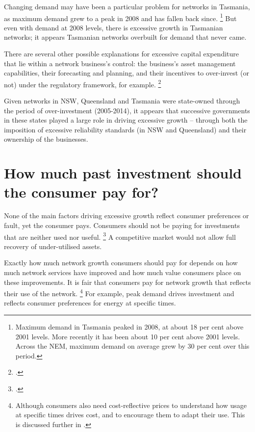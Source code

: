 \documentclass[FrontPage]{grattan}
\begin{document}
Changing demand may have been a particular problem for networks in Tasmania, as maximum demand grew to a peak in 2008 and has fallen back since.%
\footnote{Maximum demand in Tasmania peaked in 2008, at about 18 per cent above 2001 levels. More recently it has been about 10 per cent above 2001 levels. Across the NEM, maximum demand on average grew by 30 per cent over this period.}
But even with demand at 2008 levels, there is excessive growth in Tasmanian networks; it appears Tasmanian networks overbuilt for demand that never came.

There are several other possible explanations for excessive capital expenditure that lie within a network business's control: the business's asset management capabilities, their forecasting and planning, and their incentives to over-invest (or not) under the regulatory framework, for example.%
\footcite{ParsonsBrinckerhoff2012OverspendReview}

Given networks in NSW, Queensland and Tasmania were state-owned through the period of over-investment (2005-2014), it appears that successive governments in these states played a large role in driving excessive growth -- through both the imposition of excessive reliability standards (in NSW and Queensland) and their ownership of the businesses.



\section{How much past investment should the consumer pay for?}\label{sec:what-should-consumers-pay-for}
None of the main factors driving excessive growth reflect consumer preferences or fault, yet the consumer pays. Consumers should not be paying for investments that are neither used nor useful.%
\footcite{Hempling2015StrandedCosts}
A competitive market would not allow full recovery of under-utilised assets. 

Exactly how much network growth consumers should pay for depends on how much network services have improved and how much value consumers place on these improvements. It is fair that consumers pay for network growth that reflects their use of the network.%
\footnote{Although consumers also need cost-reflective prices to understand how usage at specific times drives cost, and to encourage them to adapt their use. This is discussed further in .}
For example, peak demand drives investment and reflects consumer preferences for energy at specific times. 
\end{document}
